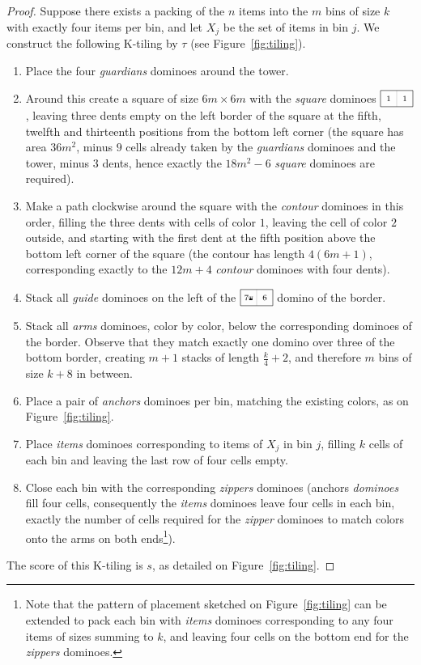 \documentclass[11pt,a4paper]{article}
\newcommand{\1}{\mathbb{1}}
\newcommand{\0}{\mathbb{0}}
\newcommand{\hdomino}[2]{\raisebox{-4pt}{\tikz[scale=.5]{\draw[black!25] (1,0) -- ++ (0,1); \draw (0,0) rectangle ++ (2,1); \node at (.5,.5) {\scriptsize $#1$}; \node at (1.5,.5) {\scriptsize $#2$};}}}
\newcommand{\crown}{\tikz[scale=.05]{
  \fill (0,0) -- (0,2) -- (.5,.5) -- (1,2) -- (1.5,.5) -- (2,2) -- (2,0) -- cycle;
  \draw (0,2) circle (5pt);
  \draw (1,2) circle (5pt);
  \draw (2,2) circle (5pt);
}}
\begin{document}
\begin{proof}
  \medskip
  \fbox{$\Rightarrow$} Suppose there exists a packing of the $n$ items into the
  $m$ bins of size $k$ with exactly four items per bin, and let $X_j$ be the
  set of items in bin $j$. We construct the following K-tiling by $\tau$ (see
  Figure~\ref{fig:tiling}).
  \begin{enumerate}[topsep=.5em,itemsep=.5em]
    \item Place the four {\em guardians} dominoes around the tower.
    \item Around this create a square of size $6m \times 6m$ with the {\em
      square} dominoes $\hdomino{1}{1}$, leaving three dents empty on the left
      border of the square at the fifth, twelfth and thirteenth positions from
      the bottom left corner (the square has area $36m^2$, minus $9$ cells
      already taken by the {\em guardians} dominoes and the tower, minus $3$
      dents, hence exactly the $18m^2-6$ {\em square} dominoes are required).
    \item Make a path clockwise around the square with the {\em contour}
      dominoes in this order, filling the three dents with cells of color $1$,
      leaving the cell of color $2$ outside, and starting with the first dent
      at the fifth position above the bottom left corner of the square (the
      contour has length $4(6m+1)$, corresponding exactly to the $12m+4$ {\em
      contour} dominoes with four dents).
    \item Stack all {\em guide} dominoes on the left of the
      $\hdomino{7{\crown}}{6}$ domino of the border.
    \item Stack all {\em arms} dominoes, color by color, below the
      corresponding dominoes of the border. Observe that they match exactly one
      domino over three of the bottom border, creating $m+1$ stacks of length
      $\frac{k}{4}+2$, and therefore $m$ bins of size $k+8$ in between.
    \item Place a pair of {\em anchors} dominoes per bin, matching the existing
      colors, as on Figure~\ref{fig:tiling}.
    \item Place {\em items} dominoes corresponding to items of $X_j$ in bin
      $j$, filling $k$ cells of each bin and leaving the last row of four cells
      empty.
    \item Close each bin with the corresponding {\em zippers} dominoes (anchors
      {\em dominoes} fill four cells, consequently the {\em items} dominoes
      leave four cells in each bin, exactly the number of cells required for
      the {\em zipper} dominoes to match colors onto the arms on both
      ends\footnote{Note that the pattern of placement sketched on
      Figure~\ref{fig:tiling} can be extended to pack each bin with {\em items}
      dominoes corresponding to any four items of sizes summing to $k$, and
      leaving four cells on the bottom end for the {\em zippers} dominoes.}).
  \end{enumerate}
  The score of this K-tiling is $s$, as detailed on Figure~\ref{fig:tiling}.


\end{proof}
\end{document}
